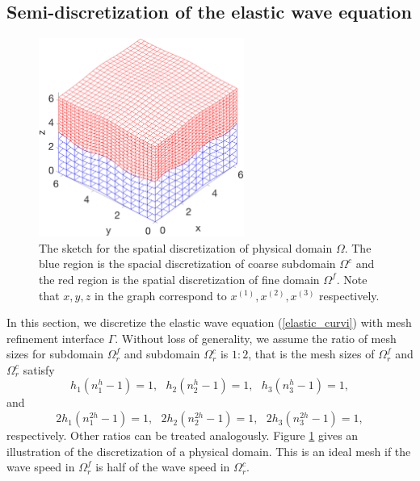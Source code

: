 \subsection{Semi-discretization of the elastic wave equation}\label{semi_discrete_form}

\begin{figure}[htbp]
	\centering
	\includegraphics[width=0.6\textwidth,trim={0.4cm 0.7cm 0.8cm 1.4cm}, clip]{physical_discretization.eps}
	\caption{The sketch for the spatial discretization of physical domain $\Omega$. The blue region is the spacial discretization of coarse subdomain $\Omega^c$ and the red region is the spatial discretization of fine domain $\Omega^f$. Note that $x,y,z$ in the graph correspond to $x^{(1)}, x^{(2)}, x^{(3)}$ respectively. }\label{physical_discretization}
\end{figure}

In this section, we discretize the elastic wave equation (\ref{elastic_curvi}) with mesh refinement interface $\Gamma$. Without loss of generality, we assume the ratio of mesh sizes for subdomain $\Omega^f_r$ and subdomain $\Omega^c_r$ is $1:2$, that is the mesh sizes of $\Omega_r^f$ and $\Omega_r^c$ satisfy
\[h_1(n_1^h-1) = 1, \ \ \ h_2(n_2^h-1) = 1, \ \ \ h_3(n_3^h-1) = 1,\]
and
\[2h_1(n_1^{2h}-1) = 1, \ \ \ 2h_2(n_2^{2h}-1) = 1, \ \ \ 2h_3(n_3^{2h}-1) = 1,\]
respectively. Other ratios can be treated analogously. Figure \ref{physical_discretization} gives an illustration of the discretization of a physical domain. This is an ideal mesh if the wave speed in $\Omega_r^f$ is half of the wave speed in $\Omega_r^c$.

